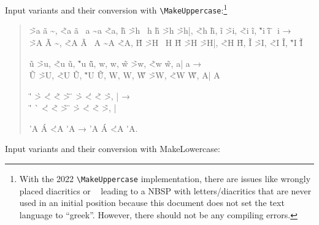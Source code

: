 \documentclass{article}
\newcommand{\LGR}{\fontencoding{LGR}\selectfont}
\newcommand{\Latin}{\fontencoding{T1}\selectfont}
\newcommand{\cs}[1]{\texttt{\textbackslash#1}}
\begin{document}
\Latin Input variants and their conversion with \cs{MakeUppercase}:\footnote{
  With the 2022 \cs{MakeUppercase} implementation, there are issues like
  wrongly placed diacritics or \texttt{~} leading to a NBSP with
  letters/diacritics that are never used in an initial position because this
  document does not set the text language to ``greek''. However, there
  should not be any compiling errors.}

\begin{quote}
\LGR
\~>a \>\~a \~, \~<a \<\~a \<~a \~\<a \~<a,
\>\~{h} \~>h \>~h \>\~h \~>h \~>h|, \~<h \<\~h,
\>\~i \~>i, \~<i \<\~i, \~"i \"\~i \"~i →\\
\MakeUppercase{
\~>a \>\~a \~, \~<a \<\~a \<~a \~\<a \~<a,
\>\~{h} \~>h \>~h \>\~h \~>h \~>h|, \~<h \<\~h,
\>\~i \~>i, \~<i \<\~i, \~"i \"\~i %
}

\>\~u \~>u, \~<u \<\~u, \~"u \"\~u,
\>w, \<w, \>\~w \~>w, \~<w \<\~w, a| a\ypogegrammeni{} → \\
\MakeUppercase{
\>\~u \~>u, \~<u \<\~u, \~"u \"\~u,
\>w, \<w, \>\~w \~>w, \~<w \<\~w, a| a\ypogegrammeni{}
}

\<{\textalpha} \>{\textepsilon} \"'{\textiota} \`>\texteta{}
\accvaria\accpsili\texteta{}
\'<{\textomicron} \~<{\textupsilon} \~>{\textomega}
\<{\textAlpha} \>{\textEpsilon} \"{\textIota} \`>\textEta{}
\'<{\textOmicron} \~<{\textUpsilon} \~>{\textOmega},
\textalpha| \textalpha\ypogegrammeni{} →
\\
\MakeUppercase{%
  \<{\textalpha} \>{\textepsilon} \"'{\textiota} \`\>\texteta{}
  \accvaria\accpsili\texteta{}
  \'<{\textomicron} \~<{\textupsilon} \~>{\textomega}
  \<{\textAlpha} \>{\textEpsilon} \"{\textIota} \`>\textEta{}
  \'<{\textOmicron} \~<{\textUpsilon} \~>{\textOmega},
  \textalpha| \textalpha\ypogegrammeni{}
}

 \<'A \<\'A \'<A \'\<A → \MakeUppercase{\<'A \<\'A \'<A \'\<A}.

\end{quote}

\Latin Input variants and their conversion with MakeLowercase:%
\end{document}
